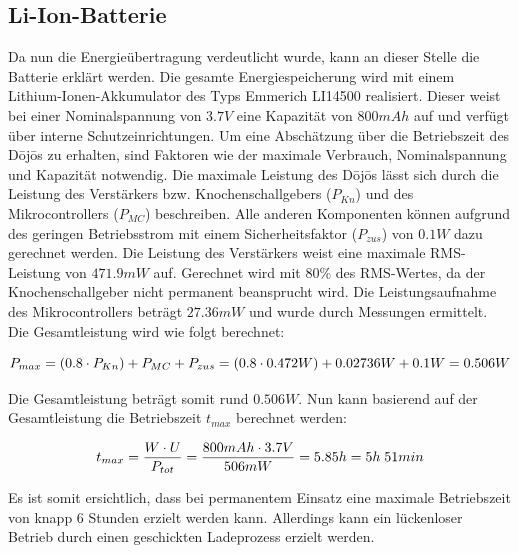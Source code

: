 \subsection{Li-Ion-Batterie}\label{sec:energiespeicher}
Da nun die Energieübertragung verdeutlicht wurde, kann an dieser Stelle die Batterie erklärt werden. Die gesamte Energiespeicherung wird mit einem Lithium-Ionen-Akkumulator des Typs Emmerich LI14500 realisiert. Dieser weist bei einer Nominalspannung von $3.7V$ eine Kapazität von $800mAh$ auf und verfügt über interne Schutzeinrichtungen. Um eine Abschätzung über die Betriebszeit des Dōjōs zu erhalten, sind Faktoren wie der maximale Verbrauch, Nominalspannung und Kapazität notwendig. Die maximale Leistung des Dōjōs lässt sich durch die Leistung des Verstärkers bzw. Knochenschallgebers ($P_{Kn}$) und des Mikrocontrollers ($P_{MC}$) beschreiben. Alle anderen Komponenten können aufgrund des geringen Betriebsstrom mit einem Sicherheitsfaktor ($P_{zus}$) von $0.1W$ dazu gerechnet werden. Die Leistung des Verstärkers weist eine maximale RMS-Leistung von $471.9mW$ auf. Gerechnet wird mit $80\%$ des RMS-Wertes, da der Knochenschallgeber nicht permanent beansprucht wird. Die Leistungsaufnahme des Mikrocontrollers beträgt $27.36mW$ und wurde durch Messungen ermittelt. Die Gesamtleistung wird wie folgt berechnet:

\begin{equation}
\centering
P_{max}=\left(0.8\cdot P_{Kn}\right)+P_{MC}+P_{zus}=(0.8\cdot 0.472W)+0.02736W+0.1W=0.506W
\label{eq:MaxLeistung}
\end{equation}

Die Gesamtleistung beträgt somit rund $0.506 W$. Nun kann basierend auf der Gesamtleistung die Betriebszeit $t_{max}$ berechnet werden:

\begin{equation}
\centering
t_{max}=\frac{W\cdot U}{P_{tot}}=\frac{800mAh \cdot 3.7V}{506mW}=5.85h= 5h \thickspace 51min
\label{eq:Betriebszeit}
\end{equation}

Es ist somit ersichtlich, dass bei permanentem Einsatz eine maximale Betriebszeit von knapp 6 Stunden erzielt werden kann. Allerdings kann ein lückenloser Betrieb durch einen geschickten Ladeprozess erzielt werden.

